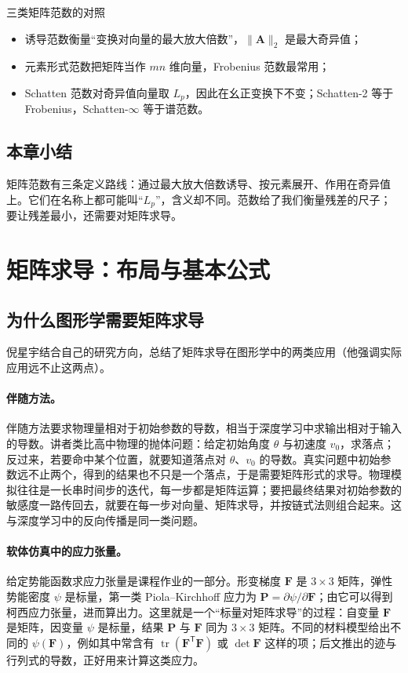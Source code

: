 \documentclass[a4paper]{article}
\begin{document}
\begin{knowledgebox}{三类矩阵范数的对照}
\begin{itemize}
\item 诱导范数衡量“变换对向量的最大放大倍数”，$\|\boldsymbol A\|_2$ 是最大奇异值；
\item 元素形式范数把矩阵当作 $mn$ 维向量，Frobenius 范数最常用；
\item Schatten 范数对奇异值向量取 $L_p$，因此在幺正变换下不变；Schatten-2 等于 Frobenius，Schatten-$\infty$ 等于谱范数。
\end{itemize}
\end{knowledgebox}

\subsection{本章小结}

矩阵范数有三条定义路线：通过最大放大倍数诱导、按元素展开、作用在奇异值上。它们在名称上都可能叫“$L_p$”，含义却不同。范数给了我们衡量残差的尺子；要让残差最小，还需要对矩阵求导。

\section{矩阵求导：布局与基本公式}

\subsection{为什么图形学需要矩阵求导}

倪星宇结合自己的研究方向，总结了矩阵求导在图形学中的两类应用（他强调实际应用远不止这两点）。

\paragraph{伴随方法。}伴随方法要求物理量相对于初始参数的导数，相当于深度学习中求输出相对于输入的导数。讲者类比高中物理的抛体问题：给定初始角度 $\theta$ 与初速度 $v_0$，求落点；反过来，若要命中某个位置，就要知道落点对 $\theta$、$v_0$ 的导数。真实问题中初始参数远不止两个，得到的结果也不只是一个落点，于是需要矩阵形式的求导。物理模拟往往是一长串时间步的迭代，每一步都是矩阵运算；要把最终结果对初始参数的敏感度一路传回去，就要在每一步对向量、矩阵求导，并按链式法则组合起来。这与深度学习中的反向传播是同一类问题。

\paragraph{软体仿真中的应力张量。}给定势能函数求应力张量是课程作业的一部分。形变梯度 $\boldsymbol F$ 是 $3\times3$ 矩阵，弹性势能密度 $\psi$ 是标量，第一类 Piola--Kirchhoff 应力为 $\boldsymbol P=\partial\psi/\partial\boldsymbol F$；由它可以得到柯西应力张量，进而算出力。这里就是一个“标量对矩阵求导”的过程：自变量 $\boldsymbol F$ 是矩阵，因变量 $\psi$ 是标量，结果 $\boldsymbol P$ 与 $\boldsymbol F$ 同为 $3\times3$ 矩阵。不同的材料模型给出不同的 $\psi(\boldsymbol F)$，例如其中常含有 $\operatorname{tr}(\boldsymbol F^{\mathsf T}\boldsymbol F)$ 或 $\det\boldsymbol F$ 这样的项；后文推出的迹与行列式的导数，正好用来计算这类应力。
\end{document}
